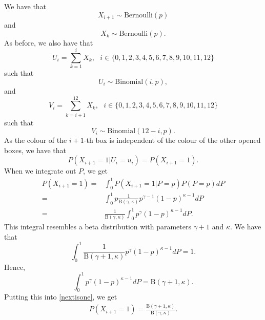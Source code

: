 \documentclass{article}
\begin{document}
We have that 
\begin{equation*}
    X_{i+1} \sim \text{Bernoulli}(p)
\end{equation*}
and
\begin{equation*}
    X_{k} \sim \text{Bernoulli}(p).
\end{equation*}
As before, we also have that
\begin{equation*}
    U_i = \sum_{k=1}^i X_k, \: \: \: i \in \{0, 1, 2,3,4,5,6,7,8,9,10,11,12\}
\end{equation*}
such that 
\begin{equation*}
    U_i \sim \text{Binomial}(i,p),
\end{equation*}
and
\begin{equation*}
    V_i = \sum_{k=i+1}^{12} X_k,\: \: \: i \in \{0, 1, 2,3,4,5,6,7,8,9,10,11,12\}
\end{equation*}
such that
\begin{equation*}
    V_i \sim \text{Binomial}(12-i,p).
\end{equation*}
As the colour of the $i+1$-th box is independent of the colour of the other opened boxes, we have that
\begin{equation*}
    P(X_{i+1}=1|U_i=u_i)=P(X_{i+1}=1).
\end{equation*}
When we integrate out $P$, we get
\begin{equation}
\label{nextisone}
    \begin{aligned}
        P(X_{i+1}=1) 
        =& \int_0^1 P(X_{i+1}=1|P=p)P(P=p)dP\\[6pt]
        =& \int_0^1 p \frac{1}{\text{B}(\gamma,\kappa)}
        p^{\gamma-1}(1-p)^{\kappa-1} dP \\[6pt]
        =& \frac{1}{\text{B}(\gamma,\kappa)} \int_0^1  
        p^{\gamma}(1-p)^{\kappa-1} dP.
    \end{aligned}
\end{equation}
This integral resembles a beta distribution with parameters $\gamma+1$ and $\kappa$. We have that
\begin{equation*}
    \int_0^1  \frac{1}{\text{B}(\gamma+1,\kappa)}
        p^{\gamma}(1-p)^{\kappa-1} dP = 1.
\end{equation*}
Hence,
\begin{equation*}
    \int_0^1  
        p^{\gamma}(1-p)^{\kappa-1} dP = \text{B}(\gamma+1,\kappa).
\end{equation*}
Putting this into \eqref{nextisone}, we get
\begin{equation*}
    \begin{aligned}
        P(X_{i+1}=1) = \frac{\text{B}(\gamma+1,\kappa)}{\text{B}(\gamma,\kappa)}.
    \end{aligned}
\end{equation*}
\end{document}
